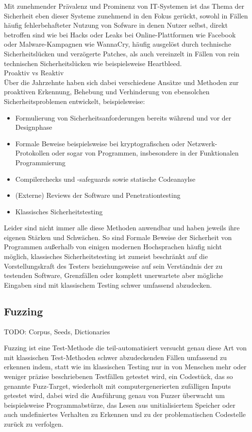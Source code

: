 \documentclass[a4paper]{article}
\begin{document}
Mit zunehmender Prävalenz und Prominenz von IT-Systemen ist das Thema der Sicherheit eben dieser Systeme zunehmend in den Fokus gerückt, sowohl in Fällen häufig fehlerbehafteter Nutzung von Sofware in denen Nutzer selbst, direkt betroffen sind wie bei Hacks oder Leaks bei Online-Plattformen wie Facebook oder Malware-Kampagnen wie WannaCry, häufig ausgelöst durch technische Sicherheitslücken und verzögerte Patches, als auch vereinzelt in Fällen von rein technischen Sicherheitslücken wie beispielsweise Heartbleed.\\
Proaktiv vs Reaktiv\\
Über die Jahrzehnte haben sich dabei verschiedene Ansätze und Methoden zur proaktiven Erkennung, Behebung und Verhinderung von ebensolchen Sicherheitsproblemen entwickelt, beispielsweise:
\begin{itemize}
\item Formulierung von Sicherheitsanforderungen bereits während und vor der Designphase
\item Formale Beweise beispielsweise bei kryptografischen oder Netzwerk-Protokollen oder sogar von Programmen, insbesondere in der Funktionalen Programmierung
\item Compilerchecks und -safeguards sowie statische Codeanaylse
\item (Externe) Reviews der Software und Penetrationtesting
\item Klassisches Sicherheitstesting
\end{itemize}
Leider sind nicht immer alle diese Methoden anwendbar und haben jeweils ihre eigenen Stärken und Schwächen. So sind Formale Beweise der Sicherheit von Programmen außerhalb von einigen modernen Hochsprachen häufig nicht möglich, klassisches Sicherheitstesting ist zumeist beschränkt auf die Vorstellungskraft des Testers beziehungsweise auf sein Verständnis der zu testenden Software, Grenzfällen oder komplett unerwartete aber mögliche Eingaben sind mit klassischem Testing schwer umfassend abzudecken.\\

\subsection{Fuzzing}

TODO: Corpus, Seeds, Dictionaries

Fuzzing ist eine Test-Methode die teil-automatisiert versucht genau diese Art von mit klassischen Test-Methoden schwer abzudeckenden Fällen umfassend zu erkennen indem, statt wie im klassischen Testing nur in von Menschen mehr oder weniger präzise beschriebenen Testfällen getestet wird, ein Codestück, das so genannte Fuzz-Target, wiederholt mit computergenerierten zufälligen Inputs getestet wird, dabei wird die Ausführung genau von Fuzzer überwacht um beispielsweise Programmabstürze, das Lesen aus unitialisiertem Speicher oder auch undefiniertes Verhalten zu Erkennen und zu der problematischen Codestelle zurück zu verfolgen.
\end{document}
